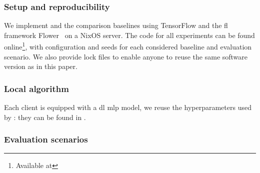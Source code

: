 \subsubsection{Setup and reproducibility\label{sec:eval.setup}}
We implement \thecontrib and the comparison baselines using TensorFlow and the \gls{fl} framework Flower~\cite{beutel_flower_2020} on a NixOS server.  
The code for all experiments can be found online\footnote{Available at \codeurl}, with configuration and seeds for each considered baseline and evaluation scenario. 
We also provide lock files to enable anyone to reuse the same software version as in this paper.

\subsubsection{Local algorithm\label{sec:eval.setup.local}}
Each client is equipped with a \gls{dl} \gls{mlp} model, we reuse the hyperparameters used by \citet{popoola_federated_2021}: they can be found in . 
\subsubsection{Evaluation scenarios\label{sec:eval.methodo.scenarios}}

